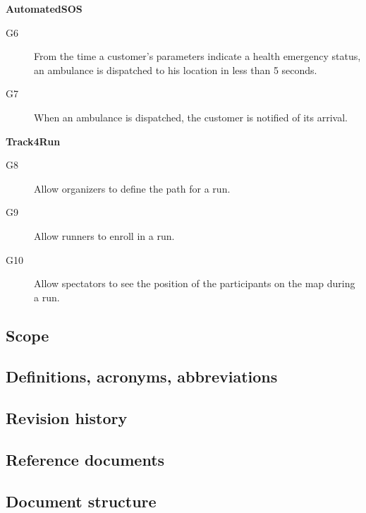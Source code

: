 \documentclass[../main.tex]{subfiles}
\begin{document}
{\bf AutomatedSOS}
\begin{description}
	\item [G6]  From the time a customer's parameters indicate a health emergency status, an ambulance is dispatched to his location in less than 5 seconds.
	\item [G7]  When an ambulance is dispatched, the customer is notified of its arrival.
\end{description}

{\bf Track4Run}
\begin{description}
	\item [G8]  Allow organizers to define the path for a run.
	\item [G9]  Allow runners to enroll in a run.
	\item [G10]  Allow spectators to see the position of the participants on the map during a run.
\end{description}

\subsection{Scope}
\subsection{Definitions, acronyms, abbreviations}
\subsection{Revision history}
\subsection{Reference documents}
\subsection{Document structure}
\end{document}
